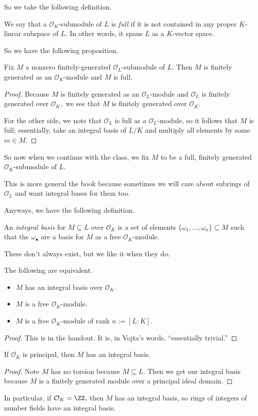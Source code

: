\documentclass[../notes.tex]{subfiles}
\begin{document}
So we take the following definition.
\begin{defi}[Full]
    We say that a $\mathcal O_K$-submodule of $L$ is \textit{full} if it is not contained in any proper $K$-linear subspace of $L.$ In other words, it spans $L$ as a $K$-vector space.
\end{defi}
So we have the following proposition.
\begin{prop}
    Fix $M$ a nonzero finitely-generated $\mathcal O_L$-submodule of $L.$ Then $M$ is finitely generated as an $\mathcal O_K$-module and $M$ is full.
\end{prop}
\begin{proof}
    Because $M$ is finitely generated as an $\mathcal O_L$-module and $\mathcal O_L$ is finitely generated over $\mathcal O_K,$ we see that $M$ is finitely generated over $\mathcal O_K.$
    
    For the other side, we note that $\mathcal O_L$ is full as a $\mathcal O_L$-module, so it follows that $M$ is full; essentially, take an integral basis of $L/K$ and multiply all elements by some $m\in M.$
\end{proof}
So now when we continue with the class, we fix $M$ to be a full, finitely generated $\mathcal O_K$-submodule of $L.$
\begin{remark}
    This is more general the book because sometimes we will care about subrings of $\mathcal O_L$ and want integral bases for them too.
\end{remark}
Anyways, we have the following definition.
\begin{defi}
    An \textit{integral basis} for $M\subseteq L$ over $\mathcal O_K$ is a set of elements $\{\omega_1,\ldots,\omega_n\}\subseteq M$ such that the $\omega_\bullet$ are a basis for $M$ as a free $\mathcal O_K$-module.
\end{defi}
These don't always exist, but we like it when they do.
\begin{prop}
    The following are equivalent.
    \begin{itemize}
        \item $M$ has an integral basis over $\mathcal O_K.$
        \item $M$ is a free $\mathcal O_K$-module.
        \item $M$ is a free $\mathcal O_K$-module of rank $n:=[L:K].$
    \end{itemize}
\end{prop}
\begin{proof}
    This is in the handout. It is, in Vojta's words, ``essentially trivial.''
\end{proof}
\begin{prop}
    If $\mathcal O_K$ is principal, then $M$ has an integral basis.
\end{prop}
\begin{proof}
    Note $M$ has no torsion because $M\subseteq L.$ Then we get our integral basis because $M$ is a finitely generated module over a principal ideal domain.
\end{proof}
In particular, if $\mathcal O_K=\ZZ,$ then $M$ has an integral basis, so rings of integers of number fields have an integral basis.
\end{document}

